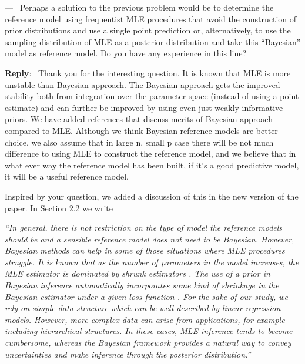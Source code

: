 \documentclass[11pt]{article}
\newcounter{reviewer}
\newcounter{point}[reviewer]
\renewcommand{\thepoint}{P\,\thereviewer.\arabic{point}}
\newenvironment{point}
   {\refstepcounter{point} \bigskip \noindent {\textbf{Reviewer~Point~\thepoint} } ---\ }
   {\par }
\newenvironment{reply}
   {\medskip \noindent \begin{sf}\textbf{Reply}:\  }
   {\medskip \end{sf}}
\newcommand{\todo}{\subsection*{\textcolor{red}{To do (comment out when done)}:}}
\begin{document}

\begin{point}
Perhaps a solution to the previous problem would be to determine the reference model using frequentist MLE procedures that avoid the construction of prior distributions and use a single point prediction or, alternatively, to use the sampling distribution of MLE as a posterior distribution and take this “Bayesian” model as reference model. Do you have any experience in this line?
\end{point}

\begin{reply}
Thank you for the interesting question. It is known that MLE is more unstable than Bayesian approach. The Bayesian approach gets the improved stability both from integration over the parameter space (instead of using a point estimate) and can further be improved by using even just weakly informative priors. We have added references that discuss merits of Bayesian approach compared to MLE. Although we think Bayesian reference models are better choice, we also assume that in large n, small p case there will be not much difference to using MLE to construct the reference model, and we believe that in what ever way the reference model has been built, if it's a good predictive model, it will be a useful reference model.

Inspired by your question, we added a discussion of this in the new version of the paper. In Section 2.2 we write

\vspace{0.5cm}

\textit{``In general, there is not restriction on the type of model the reference models 
	should be and a sensible reference model does not need to be Bayesian.
	However, Bayesian methods can help in some of those situations
	where MLE procedures struggle. 
	It is known that as the number of parameters in the model increases, the MLE
	estimator is dominated by shrunk estimators 
	\citep{stein1956inadmissibility, stein1961estimation, parmigiani2009decision, efron2011tweedie}.
	The use of a prior in Bayesian inference automatically incorporates 
	some kind of shrinkage in the Bayesian estimator under a given loss function \citep[see, e.g.][]{rockova2012hierarchical}. 
	For the sake of our study, we rely on simple data structure which can be well described 
	by linear regression models. However, more complex data can arise from applications, for example including hierarchical structures. In these cases, MLE inference tends to become cumbersome, whereas the Bayesian framework provides a natural way to convey uncertainties and make inference through the posterior distribution.''}

\vspace{0.5cm}

\end{reply}
\end{document}
